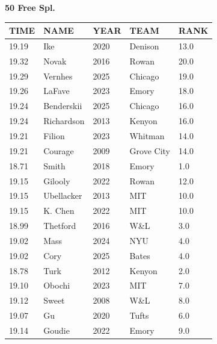 \begin{table}[H]
\centering
\begin{minipage}[t]{0.6\textwidth}
\centering
\textbf{50 Free Spl.}\\[0.1cm]
\begin{tabular}{@{}p{1.8cm}p{2.8cm}p{1.2cm}p{1.4cm}p{0.8cm}@{}}
\hline
    \textbf{TIME} & \textbf{NAME} & \textbf{YEAR} & \textbf{TEAM} & \textbf{RANK} \\
\hline
    19.19 & Ike & 2020 & Denison & 13.0 \\
    19.32 & Novak & 2016 & Rowan & 20.0 \\
    19.29 & Vernhes & 2025 & Chicago & 19.0 \\
    19.26 & LaFave & 2023 & Emory & 18.0 \\
    19.24 & Benderskii & 2025 & Chicago & 16.0 \\
    19.24 & Richardson & 2013 & Kenyon & 16.0 \\
    19.21 & Filion & 2023 & Whitman & 14.0 \\
    19.21 & Courage & 2009 & Grove City & 14.0 \\
    18.71 & Smith & 2018 & Emory & 1.0 \\
    19.15 & Gilooly & 2022 & Rowan & 12.0 \\
    19.15 & Ubellacker & 2013 & MIT & 10.0 \\
    19.15 & K. Chen & 2022 & MIT & 10.0 \\
    18.99 & Thetford & 2016 & W\&L & 3.0 \\
    19.02 & Mass & 2024 & NYU & 4.0 \\
    19.02 & Cory & 2025 & Bates & 4.0 \\
    18.78 & Turk & 2012 & Kenyon & 2.0 \\
    19.10 & Obochi & 2023 & MIT & 7.0 \\
    19.12 & Sweet & 2008 & W\&L & 8.0 \\
    19.07 & Gu & 2020 & Tufts & 6.0 \\
    19.14 & Goudie & 2022 & Emory & 9.0 \\
\hline
\end{tabular}
\end{minipage}
\end{table}

